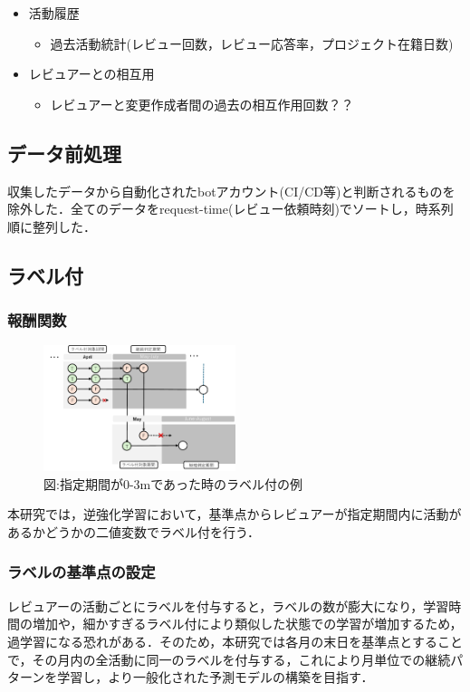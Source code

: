\documentclass[submit,techrep,noauthor]{ipsj}
\begin{document}
\begin{itemize}
    \item 活動履歴
    \begin{itemize}
        \item  過去活動統計(レビュー回数，レビュー応答率，プロジェクト在籍日数)
    \end{itemize}
\end{itemize}
\begin{itemize}
    \item レビュアーとの相互用
    \begin{itemize}
        \item レビュアーと変更作成者間の過去の相互作用回数？？
    \end{itemize}
\end{itemize}

\subsection{データ前処理}
収集したデータから自動化されたbotアカウント(CI/CD等)と判断されるものを除外した．全てのデータをrequest-time(レビュー依頼時刻)でソートし，時系列順に整列した．


\subsection{ラベル付}
\subsubsection{報酬関数}
\begin{figure}[h]
    \centering
    \includegraphics[width = 0.5\textwidth]{./Hashimoto_fig/label.pdf}
    \caption{図:指定期間が0-3mであった時のラベル付の例}
    \label{fig:label}
\end{figure}


本研究では，逆強化学習において，基準点からレビュアーが指定期間内に活動があるかどうかの二値変数でラベル付を行う．
\subsubsection{ラベルの基準点の設定}
レビュアーの活動ごとにラベルを付与すると，ラベルの数が膨大になり，学習時間の増加や，細かすぎるラベル付により類似した状態での学習が増加するため，過学習になる恐れがある．そのため，本研究では各月の末日を基準点とすることで，その月内の全活動に同一のラベルを付与する，これにより月単位での継続パターンを学習し，より一般化された予測モデルの構築を目指す．
\end{document}
